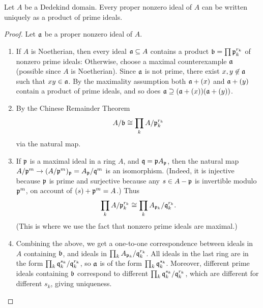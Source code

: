 \begin{thm}
Let $A$ be a Dedekind domain. Every proper nonzero ideal of $A$ can be written uniquely as a product of prime ideals.
\end{thm}
\begin{proof}
Let $\mathfrak{a}$ be a proper nonzero ideal of $A$.
\begin{enumerate}
\item
If $A$ is Noetherian, then every ideal $\mathfrak{a}\subseteq A$ contains a product $\mathfrak{b}=\prod \mathfrak{p}_k^{r_k}$ of nonzero prime ideals: Otherwise, choose a maximal counterexample $\mathfrak{a}$ (possible since $A$ is Noetherian). Since $\mathfrak{a}$ is not prime, there exist $x,y\not\in \mathfrak{a}$ such that $xy\in \mathfrak{a}$. By the maximality assumption both $\mathfrak{a}+(x)$ and $\mathfrak{a}+(y)$ contain a product of prime ideals, and so does $\mathfrak{a}\supseteq (\mathfrak{a}+(x))(\mathfrak{a}+(y))$.
\item
By the Chinese Remainder Theorem
\[
A/\mathfrak{b} \cong \prod_{k} A/\mathfrak{p}_k^{r_k}
\]
via the natural map.
\item If $\mathfrak{p}$ is a maximal ideal in a ring $A$, and $\mathfrak{q}=\mathfrak{p} A_{\mathfrak{p}}$, then the natural map $A/\mathfrak{p}^m\to (A/\mathfrak{p}^m)_{\mathfrak{p}}= A_{\mathfrak{p}}/\mathfrak{q}^m$  is an isomorphism. (Indeed, it is injective because $\mathfrak{p}$ is prime and surjective because any $s\in A-\mathfrak{p}$ is invertible modulo $\mathfrak{p}^m$, on account of $(s)+\mathfrak{p}^m=A$.) Thus
\[
\prod_{k} A/\mathfrak{p}_k^{r_k}\cong \prod_k A_{\mathfrak{p}_k}/\mathfrak{q}_k^{r_k}.
\]
(This is where we use the fact that nonzero prime ideals are maximal.)
\item Combining the above, we get a one-to-one correspondence between ideals in $A$ containing $\mathfrak{b}$, and ideals in $\prod_k A_{\mathfrak{p}_k}/\mathfrak{q}_k^{r_k}$. All ideals in the last ring are in the form $\prod_k \mathfrak{q}_k^{s_k}/\mathfrak{q}_k^{r_k}$, so $\mathfrak{a}$ is of the form $\prod_k \mathfrak{q}_k^{s_k}$. Moreover, different prime ideals containing $\mathfrak{b}$ correspond to different $\prod_k \mathfrak{q}_k^{s_k}/\mathfrak{q}_k^{r_k}$, which are different for different $s_k$, giving uniqueness.\qedhere
\end{enumerate}
\end{proof}
